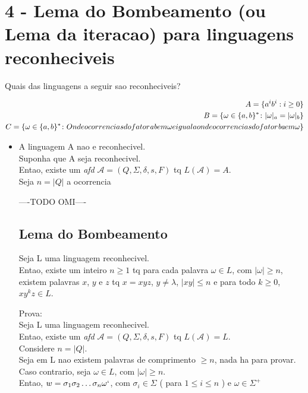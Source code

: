 \documentclass{article}
\begin{document}
\section{4 - Lema do Bombeamento (ou Lema da iteracao) para linguagens reconheciveis}

Quais das linguagens a seguir sao reconheciveis?

\begin{align*}
A = \{a^ib^i : i \geq 0\} \\
B = \{\omega \in  \{a,b\}^* \colon |\omega|_a = |\omega|_b\} \\
C = \{\omega \in  \{a,b\}^* \colon O n de ocorrencias do fator \emph{ab} em \omega e 
        igual ao n de ocorrencias do fator \emph{ba} em \omega \}
\end{align*}

\begin{itemize}
\item A linguagem A nao e reconhecivel. \\
    Suponha que A seja reconhecivel. \\
    Entao, existe um \emph{afd} $\mathcal{A} = (Q, \Sigma, \delta, s, F)$ tq $L(\mathcal{A}) = A.$ \\
    Seja $ n = |Q| $ a ocorrencia 

    ----TODO OMI----


\subsection{Lema do Bombeamento}
    Seja L uma linguagem reconhecivel.\\
    Entao, existe um inteiro $n \ge 1$ tq para cada palavra $\omega \in L$, com 
    $|\omega| \ge n$, existem palavras $x$, $y$ e $z$ tq $x = xyz$, $y \neq \lambda$,
    $|xy| \le n$ e para todo $k \ge 0$, $xy^kz \in L$.

    Prova: \\
    Seja L uma linguagem reconhecivel.\\
    Entao, existe um \emph{afd} $ \mathcal{A} = (Q, \Sigma, \delta, s, F)$ tq $L(\mathcal{A}) = L.$\\
    Considere $n = |Q|$.\\
    Seja em L nao existem palavras de comprimento $\ge n$, nada ha para provar.\\
    Caso contrario, seja $\omega \in L$, com $|\omega| \ge n$.\\
    Entao, $w = \sigma_1\sigma_2\dots\sigma_n\omega`$, com $\sigma_i \in \Sigma$ ( para $1 \le i \le n$ )
    e $\omega \in \Sigma^+$
\end{itemize}
\end{document}
